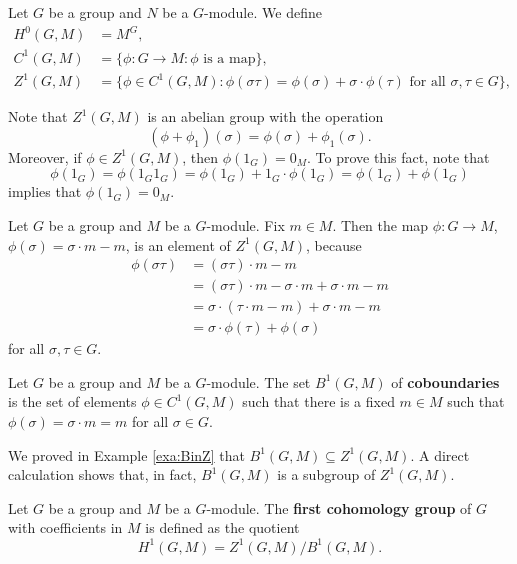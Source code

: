 \begin{definition}
    Let $G$ be a group and $N$ be a $G$-module. 
    We define 
    \begin{align*}
        H^0(G,M)&=M^G,\\
        C^1(G,M)&=\{\phi\colon G\to M:\phi\text{ is a map}\},\\
        Z^1(G,M)&=\{\phi\in C^1(G,M):\phi(\sigma\tau)=\phi(\sigma)+\sigma\cdot\phi(\tau)\text{ for all $\sigma,\tau\in G$}\},
        \end{align*}    
\end{definition}

Note that $Z^1(G,M)$ is an abelian group with the operation
\[
(\phi+\phi_1)(\sigma)=\phi(\sigma)+\phi_1(\sigma).
\]
Moreover, if $\phi\in Z^1(G,M)$, then 
$\phi(1_G)=0_M$. To prove this fact, note that  
\[
\phi(1_G)=\phi(1_G1_G)=\phi(1_G)+1_G\cdot\phi(1_G)=\phi(1_G)+\phi(1_G)
\]
implies
that $\phi(1_G)=0_M$. 

\begin{example}
\label{exa:BinZ}
    Let $G$ be a group and $M$ be a $G$-module. Fix $m\in M$. Then
    the map $\phi\colon G\to M$, $\phi(\sigma)=\sigma\cdot m-m$, is an element 
    of $Z^1(G,M)$, because 
    \begin{align*}
    \phi(\sigma\tau)&=(\sigma\tau)\cdot m-m\\
    &=(\sigma\tau)\cdot m-\sigma\cdot m+\sigma\cdot m-m\\
    &=\sigma\cdot (\tau\cdot m-m)+\sigma\cdot m-m\\
    &=\sigma\cdot \phi(\tau)+\phi(\sigma)   
    \end{align*}
    for all $\sigma,\tau\in G$.
\end{example}

\begin{definition}
    Let $G$ be a group and $M$ be a $G$-module. The set
    $B^1(G,M)$ of \textbf{coboundaries} is the set 
    of elements $\phi\in C^1(G,M)$ such that there is a fixed 
    $m\in M$ such that
    $\phi(\sigma)=\sigma\cdot m=m$ for all $\sigma\in G$.
\end{definition}

We proved in Example \ref{exa:BinZ} that  
$B^1(G,M)\subseteq Z^1(G,M)$. A direct calculation shows that, in fact, 
$B^1(G,M)$ is a subgroup of $Z^1(G,M)$. 

\begin{definition}
    Let $G$ be a group and $M$ be a $G$-module. The 
    \textbf{first cohomology group} of $G$ with coefficients
    in $M$ is defined as the quotient
    \[
    H^1(G,M)=Z^1(G,M)/B^1(G,M).
    \]
\end{definition}

